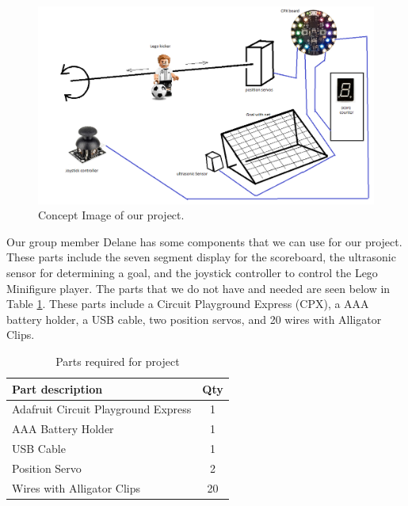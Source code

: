 \documentclass[12pt]{article}
\begin{document}
\begin{figure}[ht]
\centering
\includegraphics[width=6in]{images/Concept_image.png}
\caption{Concept Image of our project.}
\label{fig:concept_image}
\end{figure}

Our group member Delane has some components that we can use for our project. These parts include the seven segment display for the
scoreboard, the ultrasonic sensor for determining a goal, and the joystick controller to control the Lego Minifigure player.
The parts that we do not have and needed are seen below in Table \ref{table:parts_list}. These parts include a Circuit Playground Express (CPX),
 a AAA battery holder, a USB cable, two position servos, and 20 wires with Alligator Clips.

\begin{table}[ht]
  \caption{Parts required for project}
  \label{table:parts_list}
  \begin{center}
  \begin{tabular}{|p{3in}|c|}
  
  \hline
  Part description & Qty\\
  \hline
  \hline
  Adafruit Circuit Playground Express & 1 \\
  \hline
  AAA Battery Holder & 1 \\
  \hline
  USB Cable & 1 \\
  \hline
  Position Servo & 2\\
  \hline 
  Wires with Alligator Clips & 20\\
  \hline
 
  
  \end{tabular}
  \end{center}
  \end{table}
\end{document}

